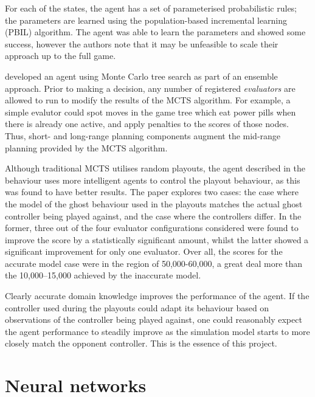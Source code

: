 For each of the states, the agent has a set of parameterised probabilistic rules; the parameters are learned using the population-based incremental learning (PBIL) algorithm.  The agent was able to learn the parameters and showed some success, however the authors note that it may be unfeasible to scale their approach up to the full game.


\citet{Me2012} developed an agent using Monte Carlo tree search as part of an ensemble approach.  Prior to making a decision, any number of registered \emph{evaluators} are allowed to run to modify the results of the MCTS algorithm.  For example, a simple evalutor could spot moves in the game tree which eat power pills when there is already one active, and apply penalties to the scores of those nodes.  Thus, short- and long-range planning components augment the mid-range planning provided by the MCTS algorithm.

Although traditional MCTS utilises random playouts, the agent described in the behaviour uses more intelligent agents to control the playout behaviour, as this was found to have better results.  The paper explores two cases: the case where the model of the ghost behaviour used in the playouts matches the actual ghost controller being played against, and the case where the controllers differ.  In the former, three out of the four evaluator configurations considered were found to improve the score by a statistically significant amount, whilst the latter showed a significant improvement for only one evaluator.  Over all, the scores for the accurate model case were in the region of 50,000-60,000, a great deal more than the 10,000--15,000 achieved by the inaccurate model.

Clearly accurate domain knowledge improves the performance of the agent.  If the controller used during the playouts could adapt its behaviour based on observations of the controller being played against, one could reasonably expect the agent performance to steadily improve as the simulation model starts to more closely match the opponent controller.  This is the essence of this project.

\section{Neural networks}

